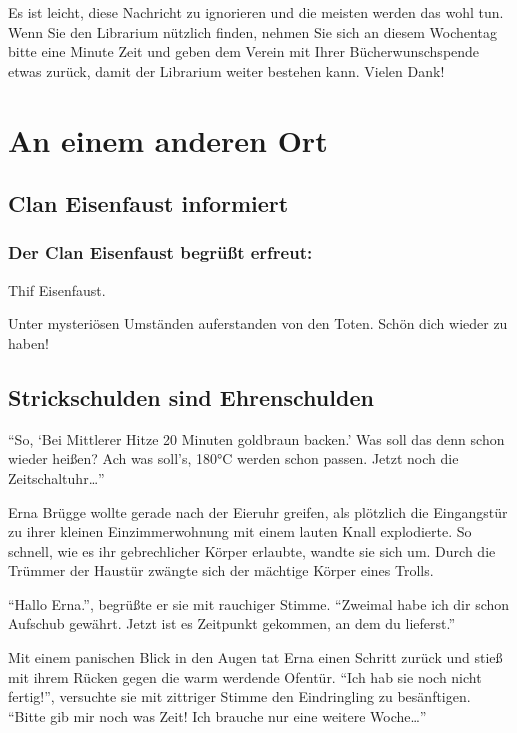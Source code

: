 Es ist leicht, diese Nachricht zu ignorieren und die meisten werden das wohl tun. Wenn Sie den Librarium nützlich finden, nehmen Sie sich an diesem Wochentag bitte eine Minute Zeit und geben dem Verein mit Ihrer Bücherwunschspende etwas zurück, damit der Librarium weiter bestehen kann. Vielen Dank!

\section{An einem anderen Ort}

\subsection{Clan Eisenfaust informiert}

\setsubsubsecheadstyle{\centering\bfseries}
\subsubsection{Der Clan Eisenfaust begrüßt erfreut:}

\begin{center}
   Thif Eisenfaust.
\end{center}
\vspace{-0.5em}
Unter mysteriösen Umständen auferstanden von den Toten. Schön dich wieder zu haben!

\subsection{Strickschulden sind Ehrenschulden}
\enquote{So, \enquote{Bei Mittlerer Hitze 20 Minuten goldbraun backen.} Was soll das denn schon wieder heißen? Ach was soll's, 180°C werden schon passen.
Jetzt noch die Zeitschaltuhr\dots}

Erna Brügge wollte gerade nach der Eieruhr greifen, als plötzlich die Eingangstür zu ihrer kleinen Einzimmerwohnung mit einem lauten Knall explodierte. So schnell, wie es ihr gebrechlicher Körper erlaubte, wandte sie sich um. Durch die Trümmer der Haustür zwängte sich der mächtige Körper eines Trolls.

\enquote{Hallo Erna.}, begrüßte er sie mit rauchiger Stimme.
\enquote{Zweimal habe ich dir schon Aufschub gewährt. Jetzt ist es Zeitpunkt gekommen, an dem du lieferst.}

Mit einem panischen Blick in den Augen tat Erna einen Schritt zurück und stieß mit ihrem Rücken gegen die warm werdende Ofentür. \enquote{Ich hab sie noch nicht fertig!}, versuchte sie mit zittriger Stimme den Eindringling zu besänftigen. \enquote{Bitte gib mir noch was Zeit! Ich brauche nur eine weitere Woche\dots}

